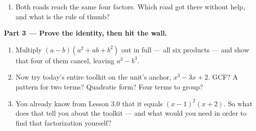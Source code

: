 \documentclass[10pt]{article}
\begin{document}
\begin{tcolorbox}[colback=white, colframe=black!40, title=\textbf{Tier E --- Extension},
    fonttitle=\bfseries, arc=1.5mm, left=3mm, right=3mm, top=2mm, bottom=2mm, breakable]
\begin{enumerate}[label=(\alph*), leftmargin=1.8em, itemsep=6pt]
  \item Both roads reach the same four factors. Which road got there without help, and what is the
        rule of thumb? 
\end{enumerate}

\vspace{5pt}
\textbf{Part 3 --- Prove the identity, then hit the wall.}
\begin{enumerate}[label=(\alph*), leftmargin=1.8em, itemsep=6pt]
  \item Multiply $(a-b)(a^2+ab+b^2)$ out in full --- all six products --- and show that four of them
        cancel, leaving $a^3 - b^3$. 
  \item Now try today's entire toolkit on the unit's anchor, $x^3 - 3x + 2$. GCF? \blank{1.2cm} \;
        A pattern for two terms? \blank{1.2cm} \; Quadratic form? \blank{1.2cm} \; Four terms to
        group? \blank{1.2cm}
  \item You already know from Lesson 3.0 that it equals $(x-1)^2(x+2)$. So what does that tell you
        about the toolkit --- and what would you need in order to find that factorization yourself?
\end{enumerate}
\end{tcolorbox}
\end{document}
